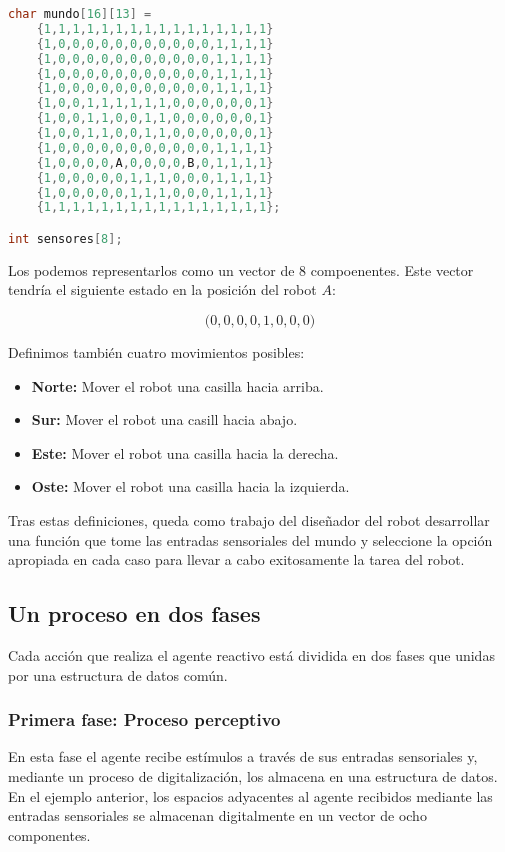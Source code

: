 \begin{lstlisting}[language=C]
char mundo[16][13] =
	{1,1,1,1,1,1,1,1,1,1,1,1,1,1,1,1}
	{1,0,0,0,0,0,0,0,0,0,0,0,1,1,1,1}
	{1,0,0,0,0,0,0,0,0,0,0,0,1,1,1,1}
	{1,0,0,0,0,0,0,0,0,0,0,0,1,1,1,1}
	{1,0,0,0,0,0,0,0,0,0,0,0,1,1,1,1}
	{1,0,0,1,1,1,1,1,1,0,0,0,0,0,0,1}
	{1,0,0,1,1,0,0,1,1,0,0,0,0,0,0,1}
	{1,0,0,1,1,0,0,1,1,0,0,0,0,0,0,1}
	{1,0,0,0,0,0,0,0,0,0,0,0,1,1,1,1}
	{1,0,0,0,0,A,0,0,0,0,B,0,1,1,1,1}
	{1,0,0,0,0,0,1,1,1,0,0,0,1,1,1,1}
	{1,0,0,0,0,0,1,1,1,0,0,0,1,1,1,1}
	{1,1,1,1,1,1,1,1,1,1,1,1,1,1,1,1};

int sensores[8];
\end{lstlisting}

\pagebreak

Los  podemos representarlos como un vector de 8 compoenentes.
Este vector tendría el siguiente estado en la posición del robot $A$:

\[\big(0,0,0,0,1,0,0,0\big)\]

Definimos también cuatro movimientos posibles:

\begin{itemize}
	\item\textbf{Norte:} Mover el robot una casilla hacia arriba.
	\item\textbf{Sur:} Mover el robot una casill hacia abajo.
	\item\textbf{Este:} Mover el robot una casilla hacia la derecha.
	\item\textbf{Oste:} Mover el robot una casilla hacia la izquierda.
\end{itemize}

Tras estas definiciones, queda como trabajo del diseñador del robot desarrollar una función que tome las entradas sensoriales del mundo y seleccione la opción apropiada en cada caso para llevar a cabo exitosamente la tarea del robot.

\subsection{Un proceso en dos fases}

Cada acción que realiza el agente reactivo está dividida en dos fases que unidas por una estructura de datos común.

\subsubsection{Primera fase: Proceso perceptivo}

En esta fase el agente recibe estímulos a través de sus entradas sensoriales y, mediante un proceso de digitalización, los almacena en una estructura de datos.
En el ejemplo anterior, los espacios adyacentes al agente recibidos mediante las entradas sensoriales se almacenan digitalmente en un vector de ocho componentes.

